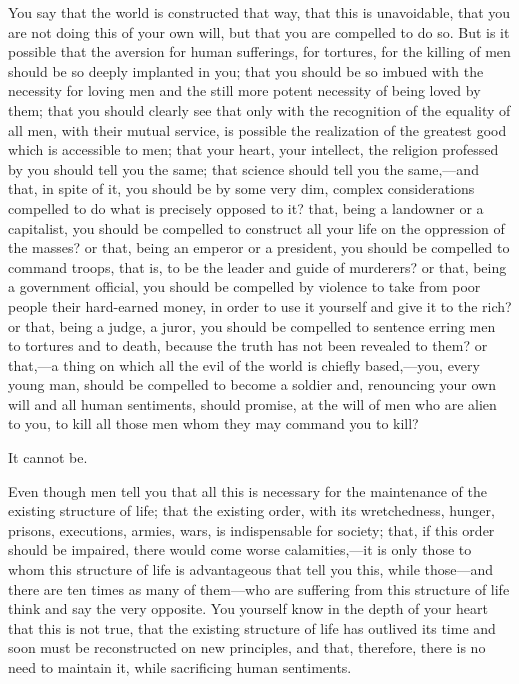 \documentclass{book}
\begin{document}
You say that the world is constructed that way, that this is unavoidable, that you are not doing this of your own will, but that you are compelled to do so. But is it possible that the aversion for human sufferings, for tortures, for the killing of men should be so deeply implanted in you; that you should be so imbued with the necessity for loving men and the still more potent necessity of being loved by them; that you should clearly see that only with the recognition of the equality of all men, with their mutual service, is possible the realization of the greatest good which is accessible to men; that your heart, your intellect, the religion professed by you should tell you the same; that science should tell you the same,—and that, in spite of it, you should be by some very dim, complex considerations compelled to do what is precisely opposed to it? that, being a landowner or a capitalist, you should be compelled to construct all your life on the oppression of the masses? or that, being an emperor or a president, you should be compelled to command troops, that is, to be the leader and guide of murderers? or that, being a government official, you should be compelled by violence to take from poor people their hard-earned money, in order to use it yourself and give it to the rich? or that, being a judge, a juror, you should be compelled to sentence erring men to tortures and to death, because the truth has not been revealed to them? or that,—a thing on which all the evil of the world is chiefly based,—you, every young man, should be compelled to become a soldier and, renouncing your own will and all human sentiments, should promise, at the will of men who are alien to you, to kill all those men whom they may command you to kill?

It cannot be.

Even though men tell you that all this is necessary for the maintenance of the existing structure of life; that the existing order, with its wretchedness, hunger, prisons, executions, armies, wars, is indispensable for society; that, if this order should be impaired, there would come worse calamities,—it is only those to whom this structure of life is advantageous that tell you this, while those—and there are ten times as many of them—who are suffering from this structure of life think and say the very opposite. You yourself know in the depth of your heart that this is not true, that the existing structure of life has outlived its time and soon must be reconstructed on new principles, and that, therefore, there is no need to maintain it, while sacrificing human sentiments.
\end{document}
